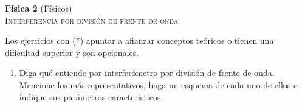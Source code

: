 \documentclass[11pt,spanish,a4paper]{article}
\begin{document}
\begin{center}
\textbf{Física 2} (Físicos) \hfill {}\\
	\textsc{\LARGE Interferencia por división de frente de onda}
\end{center}

Los ejercicios con (*) apuntar a afianzar conceptos teóricos o tienen una dificultad superior y son opcionales.


\begin{enumerate}




\section*{Dispositivos para dividir el frente de onda}








\section*{Resumen: interferómetros por división de frente de onda}
\item Diga qué entiende por interferómetro por división de frente de onda.
Mencione los más representativos, haga un esquema de cada uno de ellos e indique sus parámetros característicos.


\end{enumerate}
\end{document}
